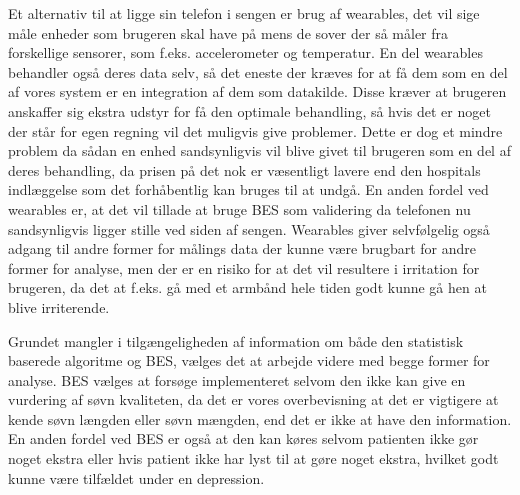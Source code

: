 Et alternativ til at ligge sin telefon i sengen er brug af wearables, det vil sige måle enheder som brugeren skal have på mens de sover der så måler fra forskellige sensorer, som f.eks. accelerometer og temperatur.
En del wearables behandler også deres data selv, så det eneste der kræves for at få dem som en del af vores system er en integration af dem som datakilde.
Disse kræver at brugeren anskaffer sig ekstra udstyr for få den optimale behandling, så hvis det er noget der står for egen regning vil det muligvis give problemer.
Dette er dog et mindre problem da sådan en enhed sandsynligvis vil blive givet til brugeren som en del af deres behandling, da prisen på det nok er væsentligt lavere end den hospitals indlæggelse som det forhåbentlig kan bruges til at undgå. 
En anden fordel ved wearables er, at det vil tillade at bruge BES som validering da telefonen nu sandsynligvis ligger stille ved siden af sengen.
Wearables giver selvfølgelig også adgang til andre former for målings data der kunne være brugbart for andre former for analyse, men der er en risiko for at det vil resultere i irritation for brugeren, da det at f.eks. gå med et armbånd hele tiden godt kunne gå hen at blive irriterende.

Grundet mangler i tilgængeligheden af information om både den statistisk baserede algoritme og BES, vælges det at arbejde videre med begge former for analyse.
BES vælges at forsøge implementeret selvom den ikke kan give en vurdering af søvn kvaliteten, da det er vores overbevisning at det er vigtigere at kende søvn længden eller søvn mængden, end det er ikke at have den information.
En anden fordel ved BES er også at den kan køres selvom patienten ikke gør noget ekstra eller hvis patient ikke har lyst til at gøre noget ekstra, hvilket godt kunne være tilfældet under en depression.
